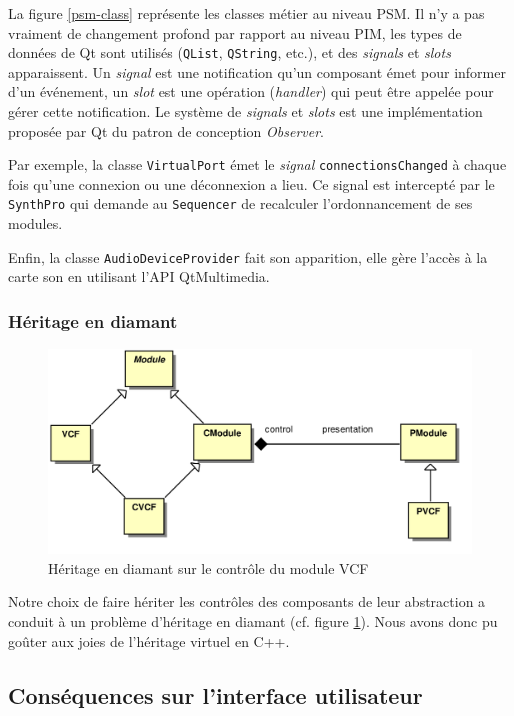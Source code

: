 La figure \ref{psm-class} représente les classes métier au niveau PSM. Il n'y a
pas vraiment de changement profond par rapport au niveau PIM, les
types de données de Qt sont utilisés (\verb!QList!, \verb!QString!,
etc.), et des \emph{signals} et \emph{slots} apparaissent. Un
\emph{signal} est une notification qu'un composant émet pour
informer d'un événement, un \emph{slot} est une opération
(\emph{handler}) qui peut être appelée pour gérer cette
notification. Le système de \emph{signals} et \emph{slots} est une
implémentation proposée par Qt du patron de conception
\emph{Observer}.

Par exemple, la classe \verb!VirtualPort! émet le \emph{signal}
\verb!connectionsChanged! à chaque fois qu'une connexion ou une
déconnexion a lieu. Ce signal est intercepté par le \verb!SynthPro!
qui demande au \verb!Sequencer! de recalculer l'ordonnancement de
ses modules.

Enfin, la classe \verb!AudioDeviceProvider! fait son apparition,
elle gère l'accès à la carte son en utilisant l'API QtMultimedia.

\subsubsection{Héritage en diamant}

\begin{figure}[ht]
\centering
\includegraphics[width=12cm]{../img/ps/pacmodule-psm.pdf}
\caption{Héritage en diamant sur le contrôle du module VCF}
\label{fig:diamond-problem}
\end{figure}

Notre choix de faire hériter les contrôles des composants de leur
abstraction a conduit à un problème d'héritage en diamant (cf. figure \ref{fig:diamond-problem}). Nous
avons donc pu goûter aux joies de l'héritage virtuel en C++.

\subsection{Conséquences sur l'interface utilisateur}

